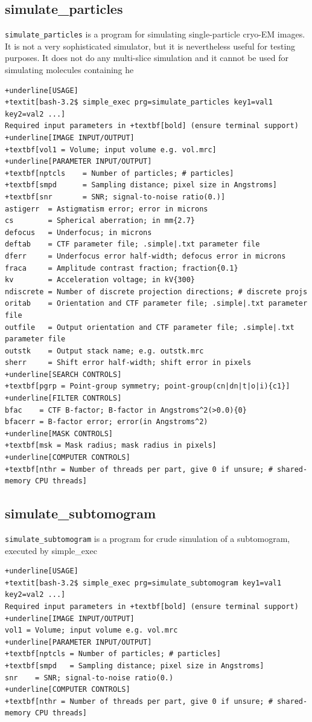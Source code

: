 \documentclass[a4paper,11pt]{article}
\newcommand{\prgname}[1]{\textcolor{NavyBlue}{\texttt{#1}}}
\begin{document}
\subsection{simulate\_particles}
\label{simulate_particles}
\prgname{simulate\_particles} is a program for simulating single-particle cryo-EM images. It is not a very sophisticated simulator, but it is nevertheless useful for testing purposes. It does not do any multi-slice simulation and it cannot be used for simulating molecules containing he
\begin{Verbatim}[commandchars=+\[\],fontsize=\small,breaklines=true]
+underline[USAGE]
+textit[bash-3.2$ simple_exec prg=simulate_particles key1=val1 key2=val2 ...]
Required input parameters in +textbf[bold] (ensure terminal support)
+underline[IMAGE INPUT/OUTPUT]
+textbf[vol1 = Volume; input volume e.g. vol.mrc]
+underline[PARAMETER INPUT/OUTPUT]
+textbf[nptcls    = Number of particles; # particles]
+textbf[smpd      = Sampling distance; pixel size in Angstroms]
+textbf[snr       = SNR; signal-to-noise ratio(0.)]
astigerr  = Astigmatism error; error in microns
cs        = Spherical aberration; in mm{2.7}
defocus   = Underfocus; in microns
deftab    = CTF parameter file; .simple|.txt parameter file
dferr     = Underfocus error half-width; defocus error in microns
fraca     = Amplitude contrast fraction; fraction{0.1}
kv        = Acceleration voltage; in kV{300}
ndiscrete = Number of discrete projection directions; # discrete projs
oritab    = Orientation and CTF parameter file; .simple|.txt parameter file
outfile   = Output orientation and CTF parameter file; .simple|.txt parameter file
outstk    = Output stack name; e.g. outstk.mrc
sherr     = Shift error half-width; shift error in pixels
+underline[SEARCH CONTROLS]
+textbf[pgrp = Point-group symmetry; point-group(cn|dn|t|o|i){c1}]
+underline[FILTER CONTROLS]
bfac    = CTF B-factor; B-factor in Angstroms^2(>0.0){0}
bfacerr = B-factor error; error(in Angstroms^2)
+underline[MASK CONTROLS]
+textbf[msk = Mask radius; mask radius in pixels]
+underline[COMPUTER CONTROLS]
+textbf[nthr = Number of threads per part, give 0 if unsure; # shared-memory CPU threads]
\end{Verbatim}

\subsection{simulate\_subtomogram}
\label{simulate_subtomogram}
\prgname{simulate\_subtomogram} is a program for crude simulation of a subtomogram, executed by simple\_exec
\begin{Verbatim}[commandchars=+\[\],fontsize=\small,breaklines=true]
+underline[USAGE]
+textit[bash-3.2$ simple_exec prg=simulate_subtomogram key1=val1 key2=val2 ...]
Required input parameters in +textbf[bold] (ensure terminal support)
+underline[IMAGE INPUT/OUTPUT]
vol1 = Volume; input volume e.g. vol.mrc
+underline[PARAMETER INPUT/OUTPUT]
+textbf[nptcls = Number of particles; # particles]
+textbf[smpd   = Sampling distance; pixel size in Angstroms]
snr    = SNR; signal-to-noise ratio(0.)
+underline[COMPUTER CONTROLS]
+textbf[nthr = Number of threads per part, give 0 if unsure; # shared-memory CPU threads]
\end{Verbatim}
\end{document}
